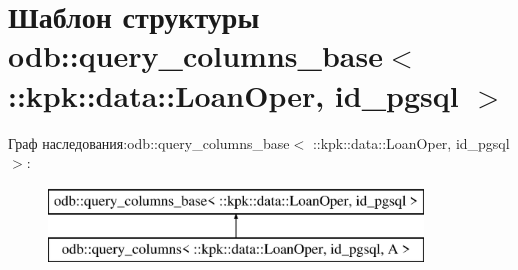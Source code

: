 \hypertarget{structodb_1_1query__columns__base_3_01_1_1kpk_1_1data_1_1_loan_oper_00_01id__pgsql_01_4}{}\section{Шаблон структуры odb\+:\+:query\+\_\+columns\+\_\+base$<$ \+:\+:kpk\+:\+:data\+:\+:Loan\+Oper, id\+\_\+pgsql $>$}
\label{structodb_1_1query__columns__base_3_01_1_1kpk_1_1data_1_1_loan_oper_00_01id__pgsql_01_4}
Граф наследования\+:odb\+:\+:query\+\_\+columns\+\_\+base$<$ \+:\+:kpk\+:\+:data\+:\+:Loan\+Oper, id\+\_\+pgsql $>$\+:\begin{figure}[H]
\begin{center}
\leavevmode
\includegraphics[height=2.000000cm]{structodb_1_1query__columns__base_3_01_1_1kpk_1_1data_1_1_loan_oper_00_01id__pgsql_01_4}
\end{center}
\end{figure}
